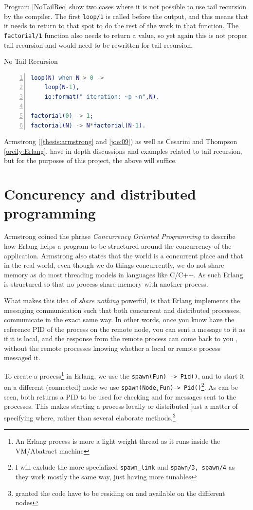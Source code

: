\documentclass[a4paper,11pt]{report}
\begin{document}
Program \ref{NoTailRec} show two cases where it is not possible to use
tail recursion by the compiler. The first \texttt{loop/1} is called
before the output, and this means that it needs to return to that
spot to do the rest of the work in that function. The
\texttt{factorial/1} function also needs to return a value, so yet
again this is not proper tail recursion and would need to be rewritten for
tail recursion. 
\begin{Program}[H]
\caption{No Tail-Recursion}
\label{NoTailRec}
\begin{lstlisting}[language=erlang,numbers=left]
loop(N) when N > 0 ->
	loop(N-1),
	io:format(" iteration: ~p ~n",N).

factorial(0) -> 1;
factorial(N) -> N*factorial(N-1).
\end{lstlisting}
\end{Program}

 Armstrong
(\ref{thesis:armstrong} and \ref{joe:09}) as well as Cesarini and
Thompson \ref{oreily:Erlang}, have in depth discussions and examples
related to tail recursion, but for the purposes of this project, the
above will suffice.

\section{Concurency and distributed programming}


Armstrong\cite{thesis:armstrong} coined the phrase
\emph{Concurrency Oriented Programming} to describe how Erlang helps
a program to be structured around the concurrency of the
application. Armstrong\cite{joe:09} also states that the
world is a concurrent place and that in the real world, even though we
do things concurrently, we do not share memory as do most threading
models in languages like C/C++. As such Erlang is
structured so that no process share memory with another process.

What makes this idea of \emph{share nothing} powerful, is that Erlang
implements the messaging communication such that both concurrent
and distributed processes, communicate in the exact same way. In other
words, once you know have the reference PID of the process on the
remote node, you can sent a message to it as if it is local, and the
response from the remote process can come back to you , without the
remote processes knowing whether a local or remote process messaged
it.

To create a process\footnote{An Erlang process is more a light weight
  thread as it runs inside the VM/Abatract machine} in Erlang, we use
the \texttt{spawn(Fun) -> Pid()}, and to start it on a different
(connected) node we use \texttt{spawn(Node,Fun)-> Pid()}\footnote{I
  will exclude the more specialized \texttt{spawn\_link} and
  \texttt{spawn/3, spawn/4} as they work mostly the same way, just
  having more tunables}. As can be seen, both returns a PID to be used
for checking and for messages sent to the processes. This makes
starting a process locally or distributed just a matter of specifying
where, rather than several elaborate methods.\footnote{granted the
  code have to be residing on and available on the diffferent nodes}
\end{document}
